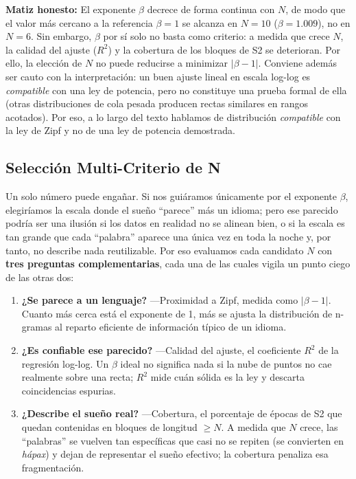 \textbf{Matiz honesto:} El exponente $\beta$ decrece de forma continua con $N$, de modo que el valor más cercano a la referencia $\beta=1$ se alcanza en $N=10$ ($\beta=1.009$), no en $N=6$. Sin embargo, $\beta$ por sí solo no basta como criterio: a medida que crece $N$, la calidad del ajuste ($R^2$) y la cobertura de los bloques de S2 se deterioran. Por ello, la elección de $N$ no puede reducirse a minimizar $|\beta-1|$. Conviene además ser cauto con la interpretación: un buen ajuste lineal en escala log-log es \textit{compatible} con una ley de potencia, pero no constituye una prueba formal de ella (otras distribuciones de cola pesada producen rectas similares en rangos acotados). Por eso, a lo largo del texto hablamos de distribución \textit{compatible} con la ley de Zipf y no de una ley de potencia demostrada.

\subsection{Selección Multi-Criterio de N}

Un solo número puede engañar. Si nos guiáramos únicamente por el exponente $\beta$, elegiríamos la escala donde el sueño ``parece'' más un idioma; pero ese parecido podría ser una ilusión si los datos en realidad no se alinean bien, o si la escala es tan grande que cada ``palabra'' aparece una única vez en toda la noche y, por tanto, no describe nada reutilizable. Por eso evaluamos cada candidato $N$ con \textbf{tres preguntas complementarias}, cada una de las cuales vigila un punto ciego de las otras dos:

\begin{enumerate}
    \item \textbf{¿Se parece a un lenguaje?} ---Proximidad a Zipf, medida como $|\beta - 1|$. Cuanto más cerca está el exponente de 1, más se ajusta la distribución de n-gramas al reparto eficiente de información típico de un idioma.
    \item \textbf{¿Es confiable ese parecido?} ---Calidad del ajuste, el coeficiente $R^2$ de la regresión log-log. Un $\beta$ ideal no significa nada si la nube de puntos no cae realmente sobre una recta; $R^2$ mide cuán sólida es la ley y descarta coincidencias espurias.
    \item \textbf{¿Describe el sueño real?} ---Cobertura, el porcentaje de épocas de S2 que quedan contenidas en bloques de longitud $\geq N$. A medida que $N$ crece, las ``palabras'' se vuelven tan específicas que casi no se repiten (se convierten en \textit{hápax}) y dejan de representar el sueño efectivo; la cobertura penaliza esa fragmentación.
\end{enumerate}

